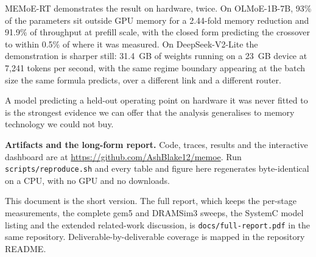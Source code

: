 \documentclass[10pt,a4paper]{article}
\begin{document}
MEMoE-RT demonstrates the result on hardware, twice. On OLMoE-1B-7B, 93\% of the
parameters sit outside GPU memory for a 2.44-fold memory reduction and 91.9\% of
throughput at prefill scale, with the closed form predicting the crossover to
within 0.5\% of where it was measured. On DeepSeek-V2-Lite the demonstration is
sharper still: 31.4~GB of weights running on a 23~GB device at 7{,}241 tokens
per second, with the same regime boundary appearing at the batch size the same
formula predicts, over a different link and a different router.

A model predicting a held-out operating point on hardware it was never fitted to
is the strongest evidence we can offer that the analysis generalises to memory
technology we could not buy.

\vspace{6pt}
\noindent\textbf{Artifacts and the long-form report.} Code, traces, results and
the interactive dashboard are at \url{https://github.com/AshBlake12/memoe}. Run
\texttt{scripts/reproduce.sh} and every table and figure here regenerates
byte-identical on a CPU, with no GPU and no downloads.

\noindent This document is the short version. The full report, which keeps the
per-stage measurements, the complete gem5 and DRAMSim3 sweeps, the SystemC
model listing and the extended related-work discussion, is
\texttt{docs/full-report.pdf} in the same repository. Deliverable-by-deliverable
coverage is mapped in the repository README.
\end{document}

